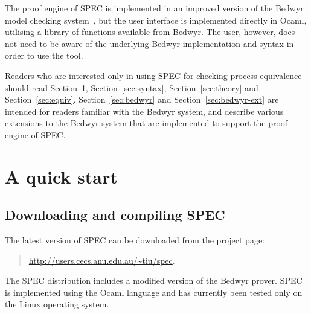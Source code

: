 \documentclass{article}
\begin{document}
The proof engine of SPEC is implemented in an improved version of 
the Bedwyr model checking system~\cite{baelde07cade}, 
but the user interface is implemented 
directly in Ocaml, utilising a library of functions available from Bedwyr. 
The user, however, does not need to be aware of the underlying
Bedwyr implementation and syntax in order to use the tool. 

Readers who are interested only in using SPEC for checking process equivalence
should read Section~\ref{sec:quick}, Section~\ref{sec:syntax}, Section~\ref{sec:theory} 
and Section~\ref{sec:equiv}.
Section~\ref{sec:bedwyr} and Section~\ref{sec:bedwyr-ext} are intended for
readers familiar with the Bedwyr system, and describe various extensions to the Bedwyr
system that are implemented to support the proof engine of SPEC.

\section{A quick start}
\label{sec:quick}

\subsection{Downloading and compiling SPEC}
The latest version of SPEC can be downloaded from the project page: 
\begin{quote}
\url{http://users.cecs.anu.edu.au/~tiu/spec}.
\end{quote}

\noindent The SPEC distribution includes a modified version of the Bedwyr prover. 
SPEC is implemented using the Ocaml language and 
has currently been tested only on the Linux operating system.
\end{document}
